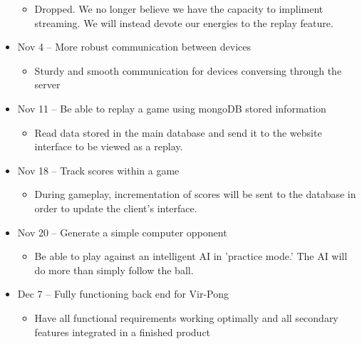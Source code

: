 \documentclass[letterpaper,12pt]{article}
\begin{document}
\begin{itemize}
\begin{itemize}
		\item Dropped. We no longer believe we have the capacity to impliment streaming. We will instead devote our energies to the replay feature.
	\end{itemize}
	\item Nov 4 -- More robust communication between devices
	\begin{itemize}
		\item Sturdy and smooth communication for devices conversing through the server
	\end{itemize}
	\item Nov 11 -- Be able to replay a game using mongoDB stored information
	\begin{itemize}
		\item Read data stored in the main database and send it to the website interface to be viewed as a replay.
	\end{itemize}
	\item Nov 18 -- Track scores within a game
	\begin{itemize}
		\item During gameplay, incrementation of scores will be sent to the database in order to update the client's interface.
	\end{itemize}
	\item Nov 20 -- Generate a simple computer opponent
	\begin{itemize}
		\item Be able to play against an intelligent AI in 'practice mode.' The AI will do more than simply follow the ball.		
	\end{itemize}
	\item Dec 7 -- Fully functioning back end for Vir-Pong
	\begin{itemize}
		\item Have all functional requirements working optimally and all secondary features integrated in a finished product		
	\end{itemize}
\end{itemize}
\end{document}
